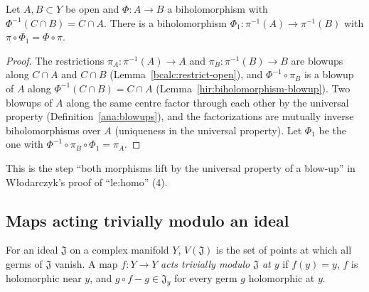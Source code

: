 \begin{lemma}
\label{mc:lift-biholomorphism}
\leanok
Let \(A,B\subset Y\) be open and \(\Phi\colon A\to B\) a biholomorphism with \(\Phi^{-1}(C\cap B)=C\cap A\). There is a biholomorphism
\(\Phi_1\colon\pi^{-1}(A)\to\pi^{-1}(B)\) with \(\pi\circ\Phi_1=\Phi\circ\pi\).
\end{lemma}
\begin{proof}
\leanok
The restrictions \(\pi_A\colon\pi^{-1}(A)\to A\) and \(\pi_B\colon\pi^{-1}(B)\to B\) are blowups along \(C\cap A\) and \(C\cap B\)
(Lemma~\ref{bcalc:restrict-open}), and \(\Phi^{-1}\circ\pi_B\) is a blowup of \(A\) along \(\Phi^{-1}(C\cap B)=C\cap A\)
(Lemma~\ref{hir:biholomorphism-blowup}). Two blowups of \(A\) along the same centre factor through each other by the universal property
(Definition~\ref{ana:blowups}), and the factorizations are mutually inverse biholomorphisms over \(A\) (uniqueness in the universal property).
Let \(\Phi_1\) be the one with \(\Phi^{-1}\circ\pi_B\circ\Phi_1=\pi_A\).
\end{proof}
This is the step ``both morphisms lift by the universal property of a blow-up'' in Włodarczyk's proof of ``le:homo'' (4).

\subsection{Maps acting trivially modulo an ideal}

For an ideal \(\mathfrak J\) on a complex manifold \(Y\), \(V(\mathfrak J)\) is the set of points at which all germs of \(\mathfrak J\) vanish. A map
\(f\colon Y\to Y\) \emph{acts trivially modulo \(\mathfrak J\) at \(y\)} if \(f(y)=y\), \(f\) is holomorphic near \(y\), and \(g\circ f-g\in\mathfrak J_y\)
for every germ \(g\) holomorphic at \(y\).

